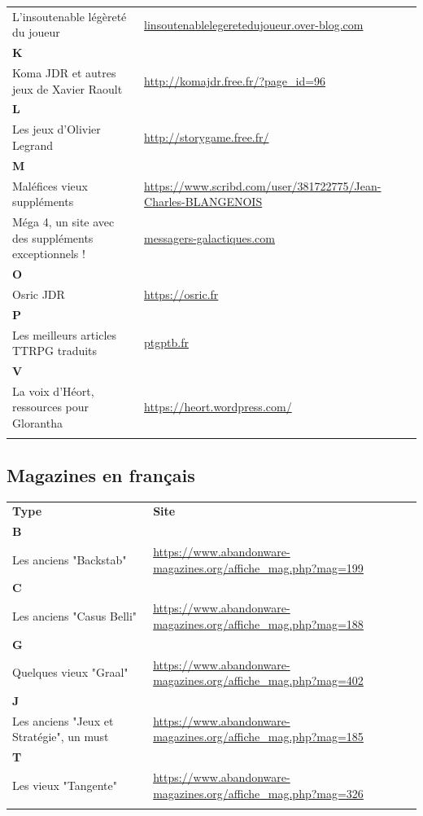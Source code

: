 \documentclass[a4paper, 11pt, twoside]{article}
\begin{document}
\begin{longtable}{p{7cm}p{7cm}}
L'insoutenable légèreté du joueur & \href{http://linsoutenablelegeretedujoueur.over-blog.com/}{linsoutenablelegeretedujoueur.over-blog.com}\\
\textbf{K} & \\
Koma JDR et autres jeux de Xavier Raoult & \url{http://komajdr.free.fr/?page\_id=96}\\
\textbf{L} & \\
Les jeux d'Olivier Legrand & \url{http://storygame.free.fr/}\\
\textbf{M} & \\
Maléfices vieux suppléments & \url{https://www.scribd.com/user/381722775/Jean-Charles-BLANGENOIS}\\
Méga 4, un site avec des suppléments exceptionnels ! & \href{https://www.messagers-galactiques.com}{messagers-galactiques.com}\\
\textbf{O} & \\
Osric JDR & \url{https://osric.fr}\\
\textbf{P} & \\
Les meilleurs articles TTRPG traduits & \href{https://ptgptb.fr}{ptgptb.fr}\\
\textbf{V} & \\
La voix d'Héort, ressources pour Glorantha & \url{https://heort.wordpress.com/}\\
 & \\
\end{longtable}

\subsection{Magazines en français}
\label{sec:org55d5dcc}

\begin{longtable}{p{7cm}p{7cm}}
\textbf{Type} & \textbf{Site}\\
\textbf{B} & \\
Les anciens "Backstab" & \url{https://www.abandonware-magazines.org/affiche\_mag.php?mag=199}\\
\textbf{C} & \\
Les anciens "Casus Belli" & \url{https://www.abandonware-magazines.org/affiche\_mag.php?mag=188}\\
\textbf{G} & \\
Quelques vieux "Graal" & \url{https://www.abandonware-magazines.org/affiche\_mag.php?mag=402}\\
\textbf{J} & \\
Les anciens "Jeux et Stratégie", un must & \url{https://www.abandonware-magazines.org/affiche\_mag.php?mag=185}\\
\textbf{T} & \\
Les vieux "Tangente" & \url{https://www.abandonware-magazines.org/affiche\_mag.php?mag=326}\\
 & \\
\end{longtable}
\end{document}
